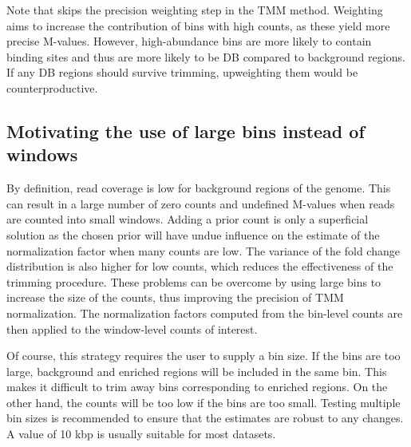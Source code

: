 \documentclass{report}\usepackage[]{graphicx}\usepackage[usenames,dvipsnames]{color}
\begin{document}
Note that  skips the precision weighting step in the TMM method.
Weighting aims to increase the contribution of bins with high counts, as these yield more precise M-values.
However, high-abundance bins are more likely to contain binding sites and thus are more likely to be DB compared to background regions.
If any DB regions should survive trimming, upweighting them would be counterproductive. 


\subsection{Motivating the use of large bins instead of windows}
\label{sec:normbinsize}

By definition, read coverage is low for background regions of the genome.
This can result in a large number of zero counts and undefined M-values when reads are counted into small windows. 
Adding a prior count is only a superficial solution as the chosen prior will have undue influence on the estimate of the normalization factor when many counts are low. 
The variance of the fold change distribution is also higher for low counts, which reduces the effectiveness of the trimming procedure.
These problems can be overcome by using large bins to increase the size of the counts, thus improving the precision of TMM normalization. 
The normalization factors computed from the bin-level counts are then applied to the window-level counts of interest.

Of course, this strategy requires the user to supply a bin size. 
If the bins are too large, background and enriched regions will be included in the same bin. 
This makes it difficult to trim away bins corresponding to enriched regions.
On the other hand, the counts will be too low if the bins are too small.
Testing multiple bin sizes is recommended to ensure that the estimates are robust to any changes. 
A value of 10 kbp is usually suitable for most datasets.
\end{document}
